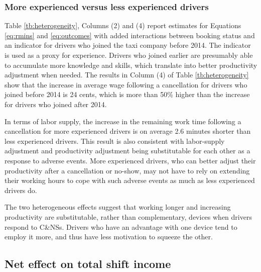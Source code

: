 \documentclass[reviewmode]{restud}
\begin{document}
\subsubsection{More experienced versus less experienced drivers}

Table \ref{tb:heterogeneity}, Columns (2) and (4) report estimates for Equations \eqref{eq:rmins} and \eqref{eq:outcomes} with added interactions between booking status and an indicator for drivers who joined the taxi company before 2014. The indicator is used as a proxy for experience. Drivers who joined earlier are presumably able to accumulate more knowledge and skills, which translate into better productivity adjustment when needed. The results in Column (4) of Table \ref{tb:heterogeneity} show that the increase in average wage following a cancellation for drivers who joined before 2014 is 24 cents, which is more than 50\% higher than the increase for drivers who joined after 2014.

In terms of labor supply, the increase in the remaining work time following a cancellation for more experienced drivers is on average 2.6 minutes shorter than less experienced drivers. This result is also consistent with labor-supply adjustment and productivity adjustment being substitutable for each other as a response to adverse events. More experienced drivers, who can better adjust their productivity after a cancellation or no-show, may not have to rely on extending their working hours to cope with such adverse events as much as less experienced drivers do.


The two heterogeneous effects suggest that working longer and increasing productivity are substitutable, rather than complementary, devices when drivers respond to C\&NSs. Drivers who have an advantage with one device tend to employ it more, and thus have less motivation to squeeze the other.



\subsection{Net effect on total shift income}
\end{document}
